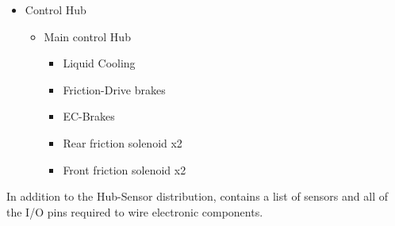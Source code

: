 \documentclass[main.tex]{subfiles}
\begin{document}
\begin{itemize}
    \item Control Hub
    \begin{itemize}
    	\item Main control Hub
    	\begin{itemize}
        	\item Liquid Cooling
            \item Friction-Drive brakes
            \item EC-Brakes
            \item Rear friction solenoid x2
            \item Front friction solenoid x2
        \end{itemize}
    \end{itemize}
\end{itemize}

In addition to the Hub-Sensor distribution,  contains a list of sensors and all of the I/O pins required to wire electronic components.
\end{document}
